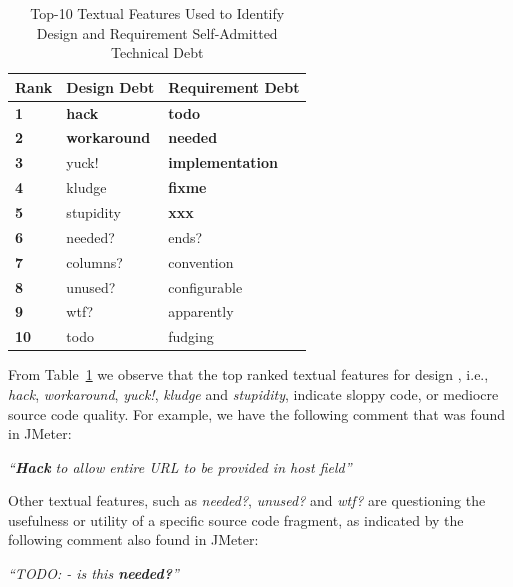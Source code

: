 \begin{table}[!thb]
    \begin{center}
        \caption{Top-10 Textual Features Used to Identify Design and Requirement Self-Admitted Technical Debt}
        \label{tbl:top_ten_features}
        \vspace{-3mm}
        \begin{tabular}{l| l l }
        \toprule
        \textbf{Rank} & \textbf{Design Debt} & \textbf{Requirement Debt}  \\
        \midrule
         \textbf{1}  & \textbf{hack}       &   \textbf{todo}     \\
         \textbf{2}  & \textbf{workaround} &   \textbf{needed}   \\
         \textbf{3}  & yuck!      &   \textbf{implementation}    \\
         \textbf{4}  & kludge     &   \textbf{fixme}             \\
         \textbf{5}  & stupidity  &   \textbf{xxx}               \\
         \textbf{6}  & needed?    &   ends?             \\
         \textbf{7}  & columns?   &   convention        \\
         \textbf{8}  & unused?    &   configurable      \\
         \textbf{9}  & wtf?       &   apparently        \\
         \textbf{10} & todo       &   fudging           \\
        \bottomrule
        \end{tabular}
    \end{center}    
\end{table}

From Table~\ref{tbl:top_ten_features} we observe that the top ranked textual features for design \SATD, i.e., \textit{hack}, \textit{workaround}, \textit{yuck!}, \textit{kludge} and \textit{stupidity}, indicate sloppy code, or mediocre source code quality. For example, we have the following comment that was found in JMeter:
\begin{displayquote}
\textit{``\textbf{Hack} to allow entire URL to be provided in host field''}
\end{displayquote}
Other textual features, such as \textit{needed?}, \textit{unused?} and \textit{wtf?} are questioning the usefulness or utility of a specific source code fragment, as indicated by the following comment also found in JMeter:
\begin{displayquote}
\textit{``TODO: - is this \textbf{needed?}''}
\end{displayquote}

